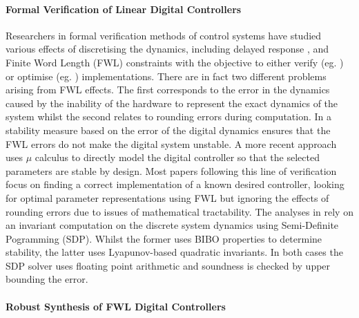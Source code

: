 \documentclass{sig-alternate-05-2015}
\begin{document}
\paragraph{Formal Verification of Linear Digital Controllers} 

Researchers in formal verification methods of control systems have studied various effects of discretising the dynamics, including delayed response \cite{Duggirala2015}, and Finite Word Length (FWL) constraints with the objective to either verify (eg. \cite{daes20161}) or optimise (eg. \cite{oudjida2014design}) implementations. There are in fact two different problems arising from FWL effects. The first corresponds to the error in the dynamics caused by the inability of the hardware to represent the exact dynamics of the system whilst the second relates to rounding errors during computation. 
In \cite{fialho1994stability} a stability measure based on the error of the digital dynamics ensures that the FWL errors do not make the digital system unstable. A more recent approach \cite{DBLP:journals/automatica/WuLCC09} uses $\mu$ calculus to directly model the digital controller so that the selected parameters are stable by design. Most papers following this line of verification focus on finding a correct implementation of a known desired controller, looking for optimal parameter representations using FWL but ignoring the effects of rounding errors due to issues of mathematical tractability.
The analyses in \cite{DBLP:conf/hybrid/WangGRJF16,DBLP:conf/hybrid/RouxJG15} rely on an invariant computation on the discrete system dynamics using Semi-Definite Pogramming (SDP). Whilst the former uses BIBO properties to determine stability, the latter uses Lyapunov-based quadratic invariants. In both cases the SDP solver uses floating point arithmetic and soundness is checked by upper bounding the error.

\paragraph{Robust Synthesis of FWL Digital Controllers}
\end{document}
